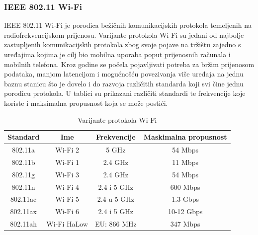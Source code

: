 \documentclass[times, utf8, diplomski]{fer}
\begin{document}
\subsubsection{IEEE 802.11 Wi-Fi}
IEEE 802.11 Wi-Fi je porodica bežičnih komunikacijskih protokola temeljenih na radiofrekvencijskom prijenosu. Varijante protokola Wi-Fi su jedani od najbolje zastupljenih komunikacijskih protokola zbog svoje pojave na tržištu zajedno s uređajima kojima je cilj bio mobilna uporaba poput prijenosnih računala i mobilnih telefona. Kroz godine se počela pojavljivati potreba za bržim prijenosom podataka, manjom latencijom i mogućnošću povezivanja više uređaja na jednu baznu stanicu  što je dovelo i do razvoja različitih standarda koji svi čine jednu porodicu protokola. U tablici su prikazani različiti standardi te frekvencije koje koriste i maksimalna propusnost koja se može postići.
\begin{table}[H]
    \centering
    \caption{Varijante protokola Wi-Fi}
    \begin{tabular}{| c | c | c | c |} 
    \hline
    \textbf{Standard} & \textbf{Ime} & \textbf{Frekvencije} & \textbf{Maskimalna propusnost}\\
    \hline\hline
    802.11a & Wi-Fi 2 & 5 GHz & 54 Mbps\\
    \hline
    802.11b & Wi-Fi 1 & 2.4 GHz & 11 Mbps\\ 
    \hline
    802.11g & Wi-Fi 3 & 2.4 GHz & 54 Mbps\\ 
    \hline
    802.11n & Wi-Fi 4 & 2.4 i 5 GHz & 600 Mbps\\ 
    \hline
    802.11ac & Wi-Fi 5 & 2.4 u 5 GHz & 1.3 Gbps \\ 
    \hline
    802.11ax & Wi-Fi 6 & 2.4 i 5 GHz & 10-12 Gbps\\ 
    \hline
    802.11ah & Wi-Fi HaLow & EU: 866 MHz & 347 Mbps\\ 
    \hline
    \end{tabular}
    \label{tab:wifi}
\end{table}
\end{document}
